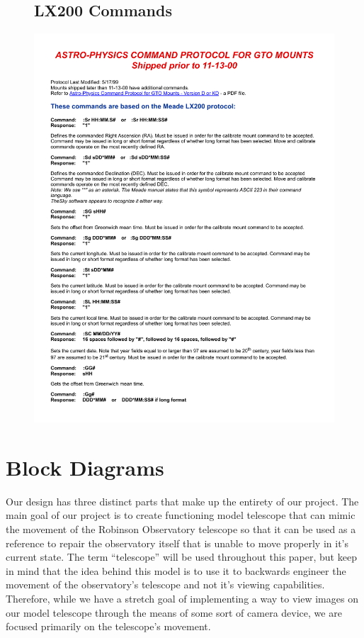 \documentclass[12pt]{report}
\begin{document}
\begin{figure}
	\subsection*{LX200 Commands}
	\includegraphics[height=\textheight,width=\linewidth]{LX200commands}
\end{figure}

\clearpage


\section*{Block Diagrams}

Our design has three distinct parts that make up the entirety of our project. The main goal of our project is to create functioning model telescope that can mimic the movement of the Robinson Observatory telescope so that it can be used as a reference to repair the observatory itself that is unable to move properly in it’s current state. The term “telescope” will be used throughout this paper, but keep in mind that the idea behind this model is to use it to backwards engineer the movement of the observatory’s telescope and not it’s viewing capabilities. Therefore, while we have a stretch goal of implementing a way to view images on our model telescope through the means of some sort of camera device, we are focused primarily on the telescope’s movement. 
\end{document}
